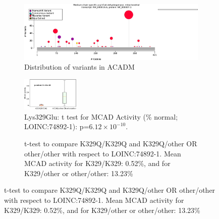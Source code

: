 \begin{figure}[htbp]
    \centering
    \begin{subfigure}[b]{0.95\textwidth}
    \centering
    \includegraphics[width=\textwidth]{ img/ACADM_protein_diagram.pdf} 
    \captionsetup{justification=raggedright,singlelinecheck=false}
    \caption{Distribution of variants in ACADM}
    \end{subfigure}
    
    \vspace{2em}

    \begin{subfigure}[b]{0.95\textwidth}
    \centering
    \includegraphics[width=0.3\textwidth]{ img/acadm_k329q.pdf} 
    \captionsetup{justification=raggedright,singlelinecheck=false}
    \caption{Lys329Glu: t test for MCAD Activity (\% normal; LOINC:74892-1): p=$6.12\times 10^{-10}$.}
    \end{subfigure}
    
    \vspace{2em}
    
    \begin{subfigure}[b]{0.95\textwidth}
    \captionsetup{justification=raggedright,singlelinecheck=false}
    \caption{t-test to compare K329Q/K329Q and K329Q/other OR other/other with respect to LOINC:74892-1. Mean MCAD activity for K329/K329: 0.52\%, and for K329/other or other/other: 13.23\% }
    \end{subfigure}
    

\end{figure}
